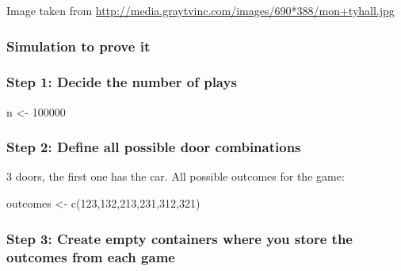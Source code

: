 \documentclass[
]{book}
\newenvironment{Shaded}{\begin{snugshade}}{\end{snugshade}}
\newcommand{\DecValTok}[1]{\textcolor[rgb]{0.00,0.00,0.81}{#1}}
\newcommand{\FunctionTok}[1]{\textcolor[rgb]{0.00,0.00,0.00}{#1}}
\newcommand{\NormalTok}[1]{#1}
\newcommand{\OtherTok}[1]{\textcolor[rgb]{0.56,0.35,0.01}{#1}}
\begin{document}
Image taken from \url{http://media.graytvinc.com/images/690*388/mon+tyhall.jpg}

\hypertarget{simulation-to-prove-it}{%
\subsubsection*{Simulation to prove it}\label{simulation-to-prove-it}}

\hypertarget{step-1-decide-the-number-of-plays}{%
\subsubsection*{Step 1: Decide the number of plays}\label{step-1-decide-the-number-of-plays}}

\begin{Shaded}
\begin{Highlighting}[]
\NormalTok{n }\OtherTok{\textless{}{-}} \DecValTok{100000}
\end{Highlighting}
\end{Shaded}

\hypertarget{step-2-define-all-possible-door-combinations}{%
\subsubsection*{Step 2: Define all possible door combinations}\label{step-2-define-all-possible-door-combinations}}

3 doors, the first one has the car. All possible outcomes for the game:

\begin{Shaded}
\begin{Highlighting}[]
\NormalTok{outcomes }\OtherTok{\textless{}{-}} \FunctionTok{c}\NormalTok{(}\DecValTok{123}\NormalTok{,}\DecValTok{132}\NormalTok{,}\DecValTok{213}\NormalTok{,}\DecValTok{231}\NormalTok{,}\DecValTok{312}\NormalTok{,}\DecValTok{321}\NormalTok{)}
\end{Highlighting}
\end{Shaded}

\hypertarget{step-3-create-empty-containers-where-you-store-the-outcomes-from-each-game}{%
\subsubsection*{Step 3: Create empty containers where you store the outcomes from each game}\label{step-3-create-empty-containers-where-you-store-the-outcomes-from-each-game}}
\end{document}
